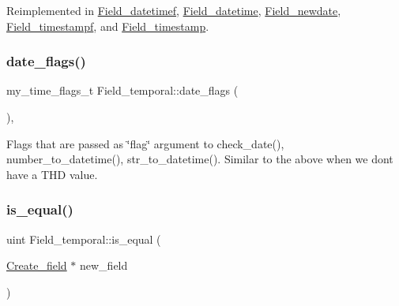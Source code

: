 Reimplemented in \mbox{\hyperlink{classField__datetimef_a5d243b48967c529a72ac3acb22b5a717}{Field\+\_\+datetimef}}, \mbox{\hyperlink{classField__datetime_a893d695981012777af8df5c7fe16769d}{Field\+\_\+datetime}}, \mbox{\hyperlink{classField__newdate_af680898e732203af05d7254e37633d71}{Field\+\_\+newdate}}, \mbox{\hyperlink{classField__timestampf_a68ee4c735131162fc015b789c89dba64}{Field\+\_\+timestampf}}, and \mbox{\hyperlink{classField__timestamp_ac94ca4c1709650bf64c38089bfbf4aaa}{Field\+\_\+timestamp}}.

\mbox{\label{classField__temporal_a4868bc52498bb520828db7db377c7efb}} 
\subsubsection{\texorpdfstring{date\+\_\+flags()}{date\_flags()}\hspace{0.1cm}{\footnotesize\ttfamily [2/2]}}
{\footnotesize\ttfamily my\+\_\+time\+\_\+flags\+\_\+t Field\+\_\+temporal\+::date\+\_\+flags (\begin{DoxyParamCaption}{ }\end{DoxyParamCaption})\hspace{0.3cm}{\ttfamily [inline]}, {\ttfamily [protected]}}

Flags that are passed as \char`\"{}flag\char`\"{} argument to check\+\_\+date(), number\+\_\+to\+\_\+datetime(), str\+\_\+to\+\_\+datetime(). Similar to the above when we don\textquotesingle{}t have a T\+HD value. \mbox{\label{classField__temporal_ad9e7766bb91a905a5d81cc1b30d73cfb}} 
\subsubsection{\texorpdfstring{is\+\_\+equal()}{is\_equal()}}
{\footnotesize\ttfamily uint Field\+\_\+temporal\+::is\+\_\+equal (\begin{DoxyParamCaption}\item[{\mbox{\hyperlink{classCreate__field}{Create\+\_\+field}} $\ast$}]{new\+\_\+field }\end{DoxyParamCaption})\hspace{0.3cm}{\ttfamily [virtual]}}

